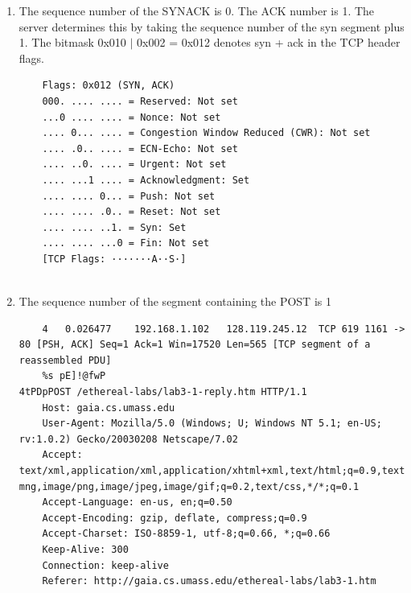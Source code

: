 \documentclass[letter,10pt]{article}
\begin{document}
\begin{enumerate}
	\item The sequence number of the SYNACK is 0. The ACK number is 1. The server determines this by taking the sequence number of the syn segment plus 1. The bitmask 0x010 $|$ 0x002 = 0x012 denotes syn + ack in the TCP header flags. 
	
	\begin{verbatim}
	Flags: 0x012 (SYN, ACK)
	000. .... .... = Reserved: Not set
	...0 .... .... = Nonce: Not set
	.... 0... .... = Congestion Window Reduced (CWR): Not set
	.... .0.. .... = ECN-Echo: Not set
	.... ..0. .... = Urgent: Not set
	.... ...1 .... = Acknowledgment: Set
	.... .... 0... = Push: Not set
	.... .... .0.. = Reset: Not set
	.... .... ..1. = Syn: Set
	.... .... ...0 = Fin: Not set
	[TCP Flags: ·······A··S·]
	
	\end{verbatim}
	
	\item The sequence number of the segment containing the POST is 1
	
	\begin{verbatim}
	4	0.026477	192.168.1.102	128.119.245.12	TCP	619	1161 -> 80 [PSH, ACK] Seq=1 Ack=1 Win=17520 Len=565 [TCP segment of a reassembled PDU]
	%s pE]!@fwP
4tPDpPOST /ethereal-labs/lab3-1-reply.htm HTTP/1.1
	Host: gaia.cs.umass.edu
	User-Agent: Mozilla/5.0 (Windows; U; Windows NT 5.1; en-US; rv:1.0.2) Gecko/20030208 Netscape/7.02
	Accept: text/xml,application/xml,application/xhtml+xml,text/html;q=0.9,text/plain;q=0.8,video/x-mng,image/png,image/jpeg,image/gif;q=0.2,text/css,*/*;q=0.1
	Accept-Language: en-us, en;q=0.50
	Accept-Encoding: gzip, deflate, compress;q=0.9
	Accept-Charset: ISO-8859-1, utf-8;q=0.66, *;q=0.66
	Keep-Alive: 300
	Connection: keep-alive
	Referer: http://gaia.cs.umass.edu/ethereal-labs/lab3-1.htm
	\end{verbatim}
	

\end{enumerate}
\end{document}
